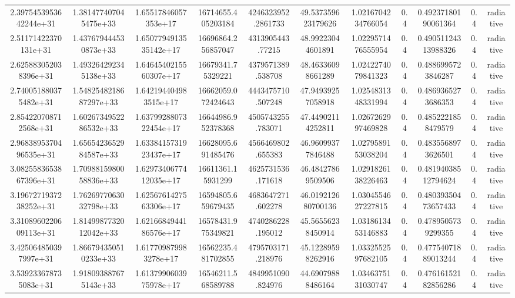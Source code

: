 \begin{table}
\begin{tabular}{ccccccccccc}
2.3975453953642244e+31 & 1.381477407045475e+33 & 1.65517846057353e+17 & 16714655.405203184 & 4246323952.2861733 & 49.537359623179626 & 1.0216704234766054 & 0.4 & 0.49237180190061364 & 0.4 & radiative \\
2.51171422370131e+31 & 1.437679444530873e+33 & 1.6507794913535142e+17 & 16696864.256857047 & 4313905443.77215 & 48.99223044601891 & 1.0229571476555954 & 0.4 & 0.49051124313988326 & 0.4 & radiative \\
2.625883052038396e+31 & 1.493264292345138e+33 & 1.6464540215560307e+17 & 16679341.75329221 & 4379571389.538708 & 48.46336098661289 & 1.0242274079841323 & 0.4 & 0.4886995723846287 & 0.4 & radiative \\
2.740051880375482e+31 & 1.5482548218687297e+33 & 1.642194404983515e+17 & 16662059.072424643 & 4443475710.507248 & 47.94939257058918 & 1.0254831348331994 & 0.4 & 0.4869365273686353 & 0.4 & radiative \\
2.854220708712568e+31 & 1.6026734952286532e+33 & 1.6379928807322454e+17 & 16644986.952378368 & 4505743255.783071 & 47.44902114252811 & 1.0267262997469828 & 0.4 & 0.4852221858479579 & 0.4 & radiative \\
2.9683895370496535e+31 & 1.6565423652984587e+33 & 1.6338415731923437e+17 & 16628095.691485476 & 4566469802.655383 & 46.96099377846488 & 1.0279589153038204 & 0.4 & 0.4835568973626501 & 0.4 & radiative \\
3.0825583653867396e+31 & 1.7098815980058836e+33 & 1.6297340677412035e+17 & 16611361.15931299 & 4625731536.171618 & 46.48427869509506 & 1.0291826138226463 & 0.4 & 0.48194038512794624 & 0.4 & radiative \\
3.1967271937238252e+31 & 1.7626977063032798e+33 & 1.6256761427563306e+17 & 16594805.659679435 & 4683647271.602278 & 46.019212680700136 & 1.0304554627227815 & 0.4 & 0.48039350473657433 & 0.4 & radiative \\
3.3108960220609113e+31 & 1.8149987732012042e+33 & 1.6216684944186576e+17 & 16578431.975349821 & 4740286228.195012 & 45.56556238450914 & 1.0318613453146883 & 0.4 & 0.4789505739299355 & 0.4 & radiative \\
3.425064850397997e+31 & 1.866794350510233e+33 & 1.617709879983278e+17 & 16562235.481702855 & 4795703171.218976 & 45.12289598262916 & 1.0332552597682105 & 0.4 & 0.47754071889013244 & 0.4 & radiative \\
3.539233678735083e+31 & 1.918093887675143e+33 & 1.6137990603975978e+17 & 16546211.568589788 & 4849951090.824976 & 44.69079888486164 & 1.0346375131030747 & 0.4 & 0.47616152182856286 & 0.4 & radiative \\

\end{tabular}
\end{table}

